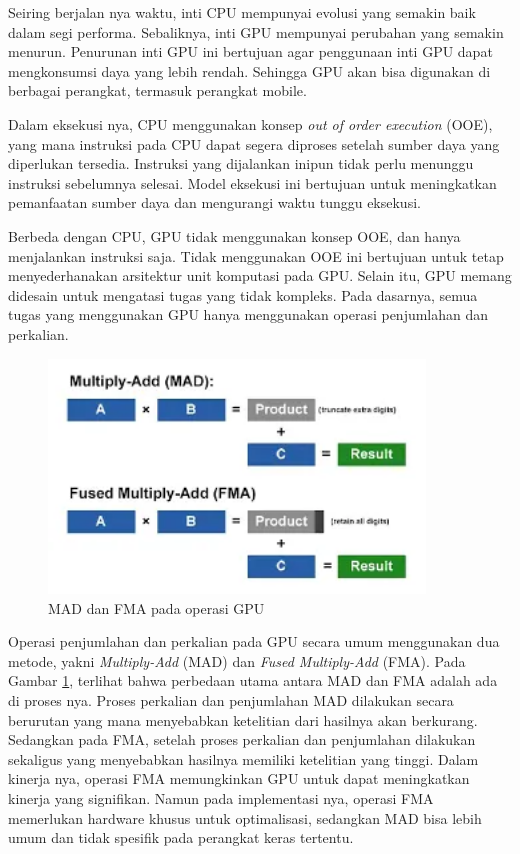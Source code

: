 Seiring berjalan nya waktu, inti CPU mempunyai evolusi yang semakin baik dalam
segi performa. Sebaliknya, inti GPU mempunyai perubahan yang semakin menurun. Penurunan
inti GPU ini bertujuan agar penggunaan inti GPU dapat mengkonsumsi daya yang lebih
rendah. Sehingga GPU akan bisa digunakan di berbagai perangkat, termasuk perangkat
mobile.

Dalam eksekusi nya, CPU menggunakan konsep \emph{out of order execution} (OOE),
yang mana instruksi pada CPU dapat segera diproses setelah sumber daya yang
diperlukan tersedia. Instruksi yang dijalankan inipun tidak perlu menunggu instruksi
sebelumnya selesai. Model eksekusi ini bertujuan untuk meningkatkan pemanfaatan
sumber daya dan mengurangi waktu tunggu eksekusi.

Berbeda dengan CPU, GPU tidak menggunakan konsep OOE, dan hanya menjalankan
instruksi saja. Tidak menggunakan OOE ini bertujuan untuk tetap menyederhanakan arsitektur
unit komputasi pada GPU. Selain itu, GPU memang didesain untuk mengatasi tugas yang
tidak kompleks. Pada dasarnya, semua tugas yang menggunakan GPU hanya menggunakan
operasi penjumlahan dan perkalian.

\begin{figure}[H]
  \centering
  \includegraphics[width=10cm]{images/mad-and-fma.png}
  \caption{MAD dan FMA pada operasi GPU}
  \label{gambar mad-and-fma}
\end{figure}

Operasi penjumlahan dan perkalian pada GPU secara umum menggunakan dua metode, yakni
\emph{Multiply-Add} (MAD) dan \emph{Fused Multiply-Add} (FMA). Pada Gambar
\ref{gambar mad-and-fma}, terlihat bahwa perbedaan utama antara MAD dan FMA adalah
ada di proses nya. Proses perkalian dan penjumlahan MAD dilakukan secara
berurutan yang mana menyebabkan ketelitian dari hasilnya akan berkurang. Sedangkan
pada FMA, setelah proses perkalian dan penjumlahan dilakukan sekaligus yang
menyebabkan hasilnya memiliki ketelitian yang tinggi. Dalam kinerja nya, operasi
FMA memungkinkan GPU untuk dapat meningkatkan kinerja yang signifikan. Namun pada
implementasi nya, operasi FMA memerlukan hardware khusus untuk optimalisasi, sedangkan
MAD bisa lebih umum dan tidak spesifik pada perangkat keras tertentu.

